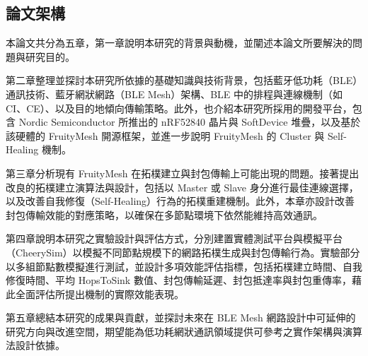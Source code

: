 \begin{ZhChapter}
\section{論文架構}
本論文共分為五章，第一章說明本研究的背景與動機，並闡述本論文所要解決的問題與研究目的。

第二章整理並探討本研究所依據的基礎知識與技術背景，包括藍牙低功耗（BLE）通訊技術、藍牙網狀網路（BLE Mesh）架構、BLE 中的排程與連線機制（如 CI、CE）、以及目的地傾向傳輸策略。此外，也介紹本研究所採用的開發平台，包含 Nordic Semiconductor 所推出的 nRF52840 晶片與 SoftDevice 堆疊，以及基於該硬體的 FruityMesh 開源框架，並進一步說明 FruityMesh 的 Cluster 與 Self-Healing 機制。

第三章分析現有 FruityMesh 在拓樸建立與封包傳輸上可能出現的問題。接著提出改良的拓樸建立演算法與設計，包括以 Master 或 Slave 身分進行最佳連線選擇，以及改善自我修復（Self-Healing）行為的拓樸重建機制。此外，本章亦設計改善封包傳輸效能的對應策略，以確保在多節點環境下依然能維持高效通訊。

第四章說明本研究之實驗設計與評估方式，分別建置實體測試平台與模擬平台（CheerySim）以模擬不同節點規模下的網路拓樸生成與封包傳輸行為。實驗部分以多組節點數模擬進行測試，並設計多項效能評估指標，包括拓樸建立時間、自我修復時間、平均 HopsToSink 數值、封包傳輸延遲、封包抵達率與封包重傳率，藉此全面評估所提出機制的實際效能表現。

第五章總結本研究的成果與貢獻，並探討未來在 BLE Mesh 網路設計中可延伸的研究方向與改進空間，期望能為低功耗網狀通訊領域提供可參考之實作架構與演算法設計依據。


\end{ZhChapter}